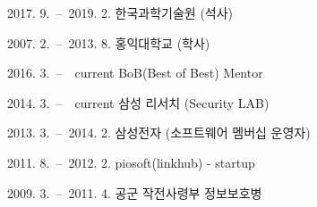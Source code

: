 \curriculumvitae[4]
		\begin{personaldata}
		 \end{personaldata}

		\begin{education}
				\item[2017. 9.\ --\ 2019. 2.] 한국과학기술원 (석사)
				\item[2007. 2.\ --\ 2013. 8.] 홍익대학교 (학사)
				
		\end{education}

		\begin{career}
				\item[2016. 3.\ --\ ~current] BoB(Best of Best) Mentor
				\item[2014. 3.\ --\ ~current] 삼성 리서치 (Security LAB)
				\item[2013. 3.\ --\ 2014. 2.] 삼성전자 (소프트웨어 멤버십 운영자) 
				\item[2011. 8.\ --\ 2012. 2.] piosoft(linkhub) - startup
				\item[2009. 3.\ --\ 2011. 4.] 공군 작전사령부 정보보호병
		\end{career}

